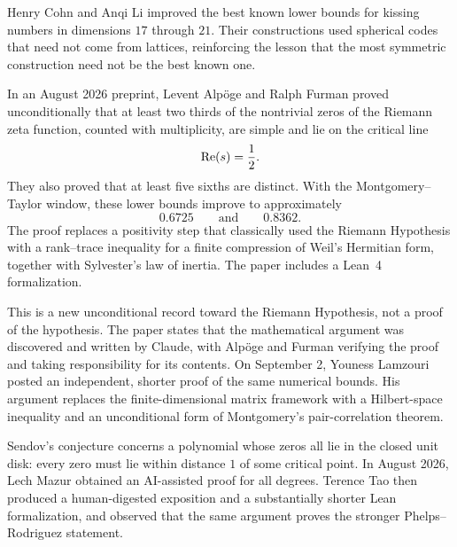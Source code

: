     \begin{fact}
        Henry Cohn and Anqi Li improved the best known lower bounds for kissing
        numbers in dimensions $17$ through $21$. Their constructions used
        spherical codes that need not come from lattices, reinforcing the lesson
        that the most symmetric construction need not be the best known one.
    \end{fact}

    \begin{fact}
        In an August 2026 preprint, Levent Alp\"oge and Ralph Furman proved
        unconditionally that at least two thirds of the nontrivial zeros of the
        Riemann zeta function, counted with multiplicity, are simple and lie on
        the critical line
        \[
            \operatorname{Re}(s)=\frac12.
        \]
        They also proved that at least five sixths are distinct. With the
        Montgomery--Taylor window, these lower bounds improve to approximately
        \[
            0.6725
            \qquad\text{and}\qquad
            0.8362.
        \]
        The proof replaces a positivity step that classically used the Riemann
        Hypothesis with a rank--trace inequality for a finite compression of
        Weil's Hermitian form, together with Sylvester's law of inertia. The
        paper includes a Lean~4 formalization.
    \end{fact}

    \begin{remark}
        This is a new unconditional record toward the Riemann Hypothesis, not a
        proof of the hypothesis. The paper states that the mathematical argument
        was discovered and written by Claude, with Alp\"oge and Furman verifying
        the proof and taking responsibility for its contents. On September 2,
        Youness Lamzouri posted an independent, shorter proof of the same
        numerical bounds. His argument replaces the finite-dimensional matrix
        framework with a Hilbert-space inequality and an unconditional form of
        Montgomery's pair-correlation theorem.
    \end{remark}

    \begin{fact}
        Sendov's conjecture concerns a polynomial whose zeros all lie in the
        closed unit disk: every zero must lie within distance $1$ of some
        critical point. In August 2026, Lech Mazur obtained an AI-assisted proof
        for all degrees. Terence Tao then produced a human-digested exposition
        and a substantially shorter Lean formalization, and observed that the
        same argument proves the stronger Phelps--Rodriguez statement.
    \end{fact}

